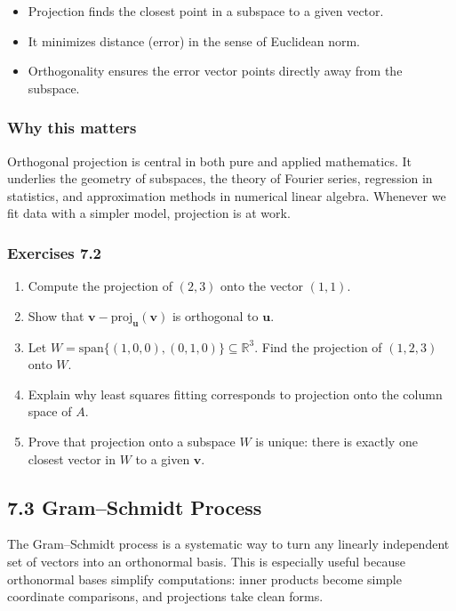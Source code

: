 \documentclass[
  12pt,
  a4paper,
]{article}
\begin{document}
\begin{itemize}
\item
  Projection finds the closest point in a subspace to a given vector.
\item
  It minimizes distance (error) in the sense of Euclidean norm.
\item
  Orthogonality ensures the error vector points directly away from the
  subspace.
\end{itemize}

\subsubsection{Why this matters}\label{why-this-matters-25}

Orthogonal projection is central in both pure and applied mathematics.
It underlies the geometry of subspaces, the theory of Fourier series,
regression in statistics, and approximation methods in numerical linear
algebra. Whenever we fit data with a simpler model, projection is at
work.

\subsubsection{Exercises 7.2}\label{exercises-72}

\begin{enumerate}
\def\labelenumi{\arabic{enumi}.}
\item
  Compute the projection of \((2,3)\) onto the vector \((1,1)\).
\item
  Show that \(\mathbf{v} - \text{proj}_{\mathbf{u}}(\mathbf{v})\) is
  orthogonal to \(\mathbf{u}\).
\item
  Let \(W = \text{span}\{(1,0,0), (0,1,0)\} \subseteq \mathbb{R}^3\).
  Find the projection of \((1,2,3)\) onto \(W\).
\item
  Explain why least squares fitting corresponds to projection onto the
  column space of \(A\).
\item
  Prove that projection onto a subspace \(W\) is unique: there is
  exactly one closest vector in \(W\) to a given \(\mathbf{v}\).
\end{enumerate}

\subsection{7.3 Gram--Schmidt Process}\label{73-gram--schmidt-process}

The Gram--Schmidt process is a systematic way to turn any linearly
independent set of vectors into an orthonormal basis. This is especially
useful because orthonormal bases simplify computations: inner products
become simple coordinate comparisons, and projections take clean forms.
\end{document}

